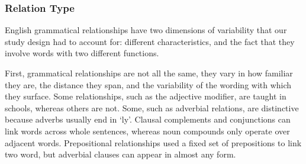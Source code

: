 \documentclass{sigchi}
\begin{document}
\subsubsection{Relation Type}
English grammatical relationships have two dimensions of variability that our study design had to account for: different characteristics, and the fact that they involve words with two different functions.

First, grammatical relationships are not all the same, they vary in how familiar they are, the distance they span, and the variability of the wording with which they surface.  Some relationships, such as the adjective modifier, are taught in schools, whereas others are not. Some, such as adverbial relations, are distinctive because adverbs usually end in `ly'. Clausal complements and conjunctions can link words across whole sentences, whereas noun compounds only operate over adjacent words. Prepositional relationships used a fixed set of prepositions to link two word, but adverbial clauses can appear in almost any form.
\end{document}
